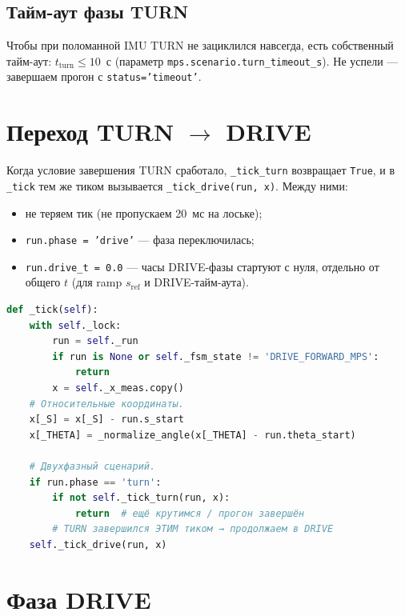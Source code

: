 \subsection{Тайм-аут фазы TURN}

Чтобы при поломанной IMU TURN не зациклился навсегда, есть собственный
тайм-аут: $t_\text{turn} \le 10$~с (параметр
\texttt{mps.scenario.turn\_timeout\_s}). Не успели --- завершаем
прогон с \texttt{status='timeout'}.

\section{Переход TURN \texorpdfstring{$\to$}{->} DRIVE}

Когда условие завершения TURN сработало, \texttt{\_tick\_turn}
возвращает \texttt{True}, и в \texttt{\_tick} тем же тиком вызывается
\texttt{\_tick\_drive(run, x)}. Между ними:

\begin{itemize}
  \item не теряем тик (не пропускаем 20~мс на лоське);
  \item \texttt{run.phase = 'drive'} --- фаза переключилась;
  \item \texttt{run.drive\_t = 0.0} --- часы DRIVE-фазы стартуют с нуля,
        отдельно от общего $t$ (для ramp $s_\text{ref}$ и DRIVE-тайм-аута).
\end{itemize}

\begin{codebox}[title={\filepath{mps\_node.py:366}, общий tick}]
\begin{lstlisting}[language=Python]
def _tick(self):
    with self._lock:
        run = self._run
        if run is None or self._fsm_state != 'DRIVE_FORWARD_MPS':
            return
        x = self._x_meas.copy()
    # Относительные координаты.
    x[_S] = x[_S] - run.s_start
    x[_THETA] = _normalize_angle(x[_THETA] - run.theta_start)

    # Двухфазный сценарий.
    if run.phase == 'turn':
        if not self._tick_turn(run, x):
            return  # ещё крутимся / прогон завершён
        # TURN завершился ЭТИМ тиком → продолжаем в DRIVE
    self._tick_drive(run, x)
\end{lstlisting}
\end{codebox}

\section{Фаза DRIVE}

